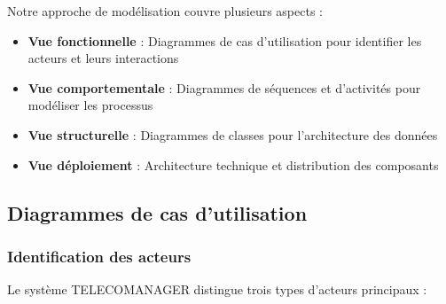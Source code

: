 \documentclass[12pt,a4paper]{report}
\begin{document}
Notre approche de modélisation couvre plusieurs aspects :
\begin{itemize}
\item \textbf{Vue fonctionnelle} : Diagrammes de cas d'utilisation pour identifier les acteurs et leurs interactions
\item \textbf{Vue comportementale} : Diagrammes de séquences et d'activités pour modéliser les processus
\item \textbf{Vue structurelle} : Diagrammes de classes pour l'architecture des données
\item \textbf{Vue déploiement} : Architecture technique et distribution des composants
\end{itemize}

\subsection{Diagrammes de cas d'utilisation}

\subsubsection{Identification des acteurs}
Le système TELECOMANAGER distingue trois types d'acteurs principaux :
\end{document}
